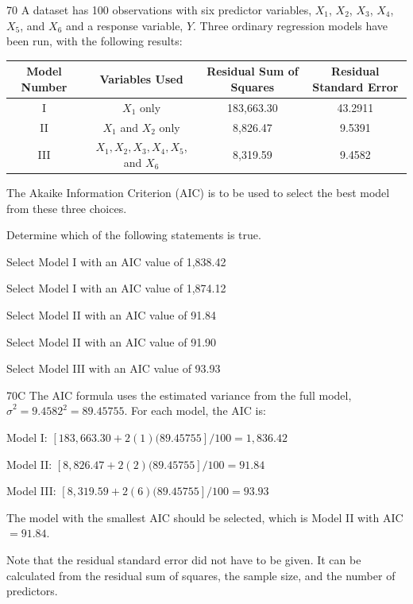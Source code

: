 \begin{question}{70}
A dataset has 100 observations with six predictor variables, $X_1$, $X_2$, $X_3$, $X_4$, $X_5$, and $X_6$ and a response variable, $Y$. Three ordinary regression models have been run, with the following results:
\begin{center}
\begin{tabular}{|c|c|c|c|}
\hline
Model Number & Variables Used & Residual Sum of Squares & Residual Standard Error \\ \hline
I & $X_1$ only & 183{,}663.30 & 43.2911 \\ \hline
II & $X_1$ and $X_2$ only & 8{,}826.47 & 9.5391 \\ \hline
III & $X_1, X_2, X_3, X_4, X_5$, and $X_6$ & 8{,}319.59 & 9.4582 \\ \hline
\end{tabular}
\end{center}

The Akaike Information Criterion (AIC) is to be used to select the best model from these three choices.

Determine which of the following statements is true.

\begin{choices}
\item Select Model I with an AIC value of 1{,}838.42
\item Select Model I with an AIC value of 1{,}874.12
\item Select Model II with an AIC value of 91.84
\item Select Model II with an AIC value of 91.90
\item Select Model III with an AIC value of 93.93
\end{choices}
\end{question}
\begin{solution}{70}{C}
The AIC formula uses the estimated variance from the full model, $\hat{\sigma}^2 = 9.4582^2 = 89.45755$. For each model, the AIC is:

Model I: $[183{,}663.30 + 2(1)(89.45755]/100 = 1{,}836.42$

Model II: $[8{,}826.47 + 2(2)(89.45755]/100 = 91.84$

Model III: $[8{,}319.59 + 2(6)(89.45755]/100 = 93.93$

The model with the smallest AIC should be selected, which is Model II with AIC $= 91.84$.

Note that the residual standard error did not have to be given. It can be calculated from the residual sum of squares, the sample size, and the number of predictors.
\end{solution}

